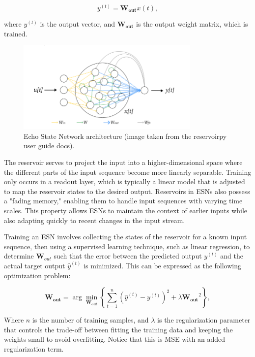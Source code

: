 \documentclass[11pt]{article}
\begin{document}
\begin{equation}
y^{(t)} = \mathbf{W_{out}}x{(t)},
\end{equation}

where $y^{(t)}$ is the output vector, and $\mathbf{W_{out}}$ is the output weight matrix, which is trained.

\begin{figure}[h] 
\centering 
\includegraphics[width=0.8\textwidth]{echo_diagram.png} 
\caption{Echo State Network architecture (image taken from the reservoirpy user guide docs).}
\label{fig:esn}
\end{figure}

The reservoir serves to project the input into a higher-dimensional space where the different parts of the input sequence become more linearly separable. Training only occurs in a readout layer, which is typically a linear model that is adjusted to map the reservoir states to the desired output. Reservoirs in ESNs also possess a "fading memory," enabling them to handle input sequences with varying time scales. This property allows ESNs to maintain the context of earlier inputs while also adapting quickly to recent changes in the input stream.

Training an ESN involves collecting the states of the reservoir for a known input sequence, then using a supervised learning technique, such as linear regression, to determine $\mathbf{W}_{out}$ such that the error between the predicted output $y^{(t)}$ and the actual target output $\hat{y}^{(t)}$ is minimized. This can be expressed as the following optimization problem:

\begin{equation}
\mathbf{W_{out}} = \arg\min_{\mathbf{W_{out}}} \left\{\sum_{t=1}^{n} (\hat{y}^{(t)} - y^{(t)})^2 + \lambda \mathbf{W_{out}}^2\right\},
\end{equation}

Where $n$ is the number of training samples, and $\lambda$ is the regularization parameter that controls the trade-off between fitting the training data and keeping the weights small to avoid overfitting. Notice that this is MSE with an added regularization term.
\end{document}
